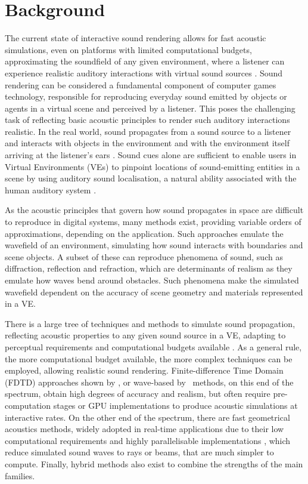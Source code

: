 \chapter{Background}\label{ch:Background}

The current state of interactive sound rendering allows for fast acoustic simulations, even on platforms with limited computational budgets, approximating the soundfield of any given environment, where a listener can experience realistic auditory interactions with virtual sound sources \citep{lakka2018spatial, hulusic2012acoustic}. Sound rendering can be considered a fundamental component of computer games technology, responsible for reproducing everyday sound emitted by objects or agents in a virtual scene and perceived by a listener. This poses the challenging task of reflecting basic acoustic principles to render such auditory interactions realistic. In the real world, sound propagates from a sound source to a listener and interacts with objects in the environment and with the environment itself arriving at the listener's ears \citep{kuttruff2016room}. Sound cues alone are sufficient to enable users in Virtual Environments (VEs) to pinpoint locations of sound-emitting entities in a scene by using auditory sound localisation, a natural ability associated with the human auditory system \citep{lokki2005navigation, rubio2017immersive}. \par
As the acoustic principles that govern how sound propagates in space are difficult to reproduce in digital systems, many methods exist, providing variable orders of approximations, depending on the application. Such approaches emulate the wavefield of an environment, simulating how sound interacts with boundaries and scene objects. A subset of these can reproduce phenomena of sound, such as diffraction, reflection and refraction, which are determinants of realism as they emulate how waves bend around obstacles. Such phenomena make the simulated wavefield dependent on the accuracy of scene geometry and materials represented in a VE. \par
There is a large tree of techniques and methods to simulate sound propagation, reflecting acoustic properties to any given sound source in a VE, adapting to perceptual requirements and computational budgets available \cite{doukakis2019audio}. As a general rule, the more computational budget available, the more complex techniques can be employed, allowing realistic sound rendering. Finite-difference Time Domain (FDTD) approaches shown by \cite{hamilton2017fdtd}, or wave-based by~\cite{raghuvanshi2014parametric} methods, on this end of the spectrum, obtain high degrees of accuracy and realism, but often require pre-computation stages or GPU implementations to produce acoustic simulations at interactive rates. On the other end of the spectrum, there are fast geometrical acoustics methods, widely adopted in real-time applications due to their low computational requirements and highly parallelisable implementations \citep{cowan2010gpu}, which reduce simulated sound waves to rays or beams, that are much simpler to compute. Finally, hybrid methods also exist to combine the strengths of the main families. \par

